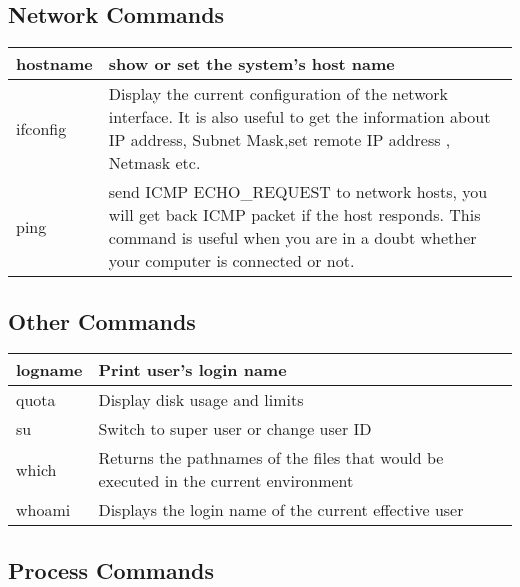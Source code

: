 \subsection{Network Commands}

\begin{tabular}{|p{}|p{}|} \hline
hostname  & show or set the system's host name \\ \hline
ifconfig  & Display the current configuration of the network interface. It is also useful to get the information about IP address, Subnet Mask,set remote IP address , Netmask etc. \\ \hline
ping      & send ICMP ECHO\_REQUEST to network hosts, you will get back ICMP packet if the host responds.  This command is useful when you are in a doubt whether your computer is connected or not. \\ \hline
\end{tabular}


\subsection{Other Commands}
\begin{tabular}{|p{}|p{}|} \hline
logname & Print user's login name \\ \hline
quota   & Display disk usage and limits \\ \hline
su      & Switch to super user or change user ID \\ \hline
which   & Returns the pathnames of the files that would be executed in the current environment \\ \hline
whoami  & Displays the login name of the current effective user \\ \hline
\end{tabular}

\subsection{Process Commands}

